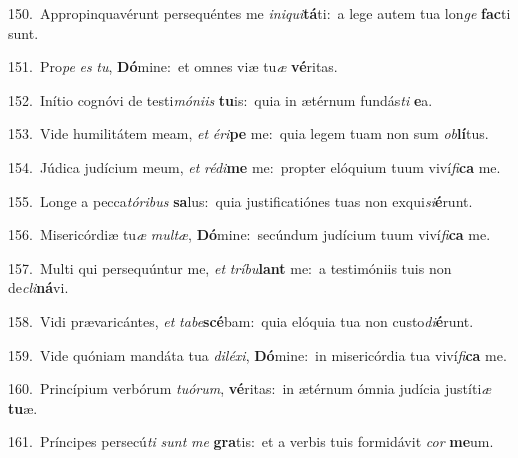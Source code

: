 {\numbfont\textcolor{\numbcolor}{150.}}~Appropinquavérunt persequéntes me \textit{in}\-\textit{i}\textit{qui}\textbf{tá}ti:~\star a lege autem tua lon\textit{ge} \textbf{fac}\-ti sunt.\par
{\numbfont\textcolor{\numbcolor}{151.}}~Pro\textit{pe} \textit{es} \textit{tu}\-, \textbf{Dó}\-mine:~\star et omnes viæ tu\textit{æ} \textbf{vé}\-ritas.\par
{\numbfont\textcolor{\numbcolor}{152.}}~Inítio cognóvi de testi\-\textit{mó}\-\textit{ni}\textit{is} \textbf{tu}\-is:~\star quia in ætérnum fundás\textit{ti} \textbf{e}\-a.\par
{\numbfont\textcolor{\numbcolor}{153.}}~Vide humilitátem meam, \textit{et} \textit{é}\-\textit{ri}\textbf{pe} me:~\star quia legem tuam non sum \textit{ob}\-\textbf{lí}tus.\par
{\numbfont\textcolor{\numbcolor}{154.}}~Júdica judícium meum, \textit{et} \textit{réd}\-\textit{i}\textbf{me} me:~\star propter elóquium tuum viví\-\textit{fi}\-\textbf{ca} me.\par
{\numbfont\textcolor{\numbcolor}{155.}}~Longe a pecca\-\textit{tó}\-\textit{ri}\textit{bus} \textbf{sa}\-lus:~\star quia justificatiónes tuas non exqui\-\textit{si}\-\textbf{é}runt.\par
{\numbfont\textcolor{\numbcolor}{156.}}~Misericórdiæ tu\textit{æ} \textit{mul}\-\textit{tæ}, \textbf{Dó}\-mine:~\star secúndum judícium tuum viví\-\textit{fi}\-\textbf{ca} me.\par
{\numbfont\textcolor{\numbcolor}{157.}}~Multi qui persequúntur me, \textit{et} \textit{trí}\-\textit{bu}\textbf{lant} me:~\star a testimóniis tuis non de\-\textit{cli}\-\textbf{ná}vi.\par
{\numbfont\textcolor{\numbcolor}{158.}}~Vidi prævaricántes, \textit{et} \textit{ta}\-\textit{be}\textbf{scé}bam:~\star quia elóquia tua non custo\-\textit{di}\-\textbf{é}runt.\par
{\numbfont\textcolor{\numbcolor}{159.}}~Vide quóniam mandáta tua \textit{di}\-\textit{lé}\textit{xi}, \textbf{Dó}\-mine:~\star in misericórdia tua viví\-\textit{fi}\-\textbf{ca} me.\par
{\numbfont\textcolor{\numbcolor}{160.}}~Princípium verbórum \textit{tu}\-\textit{ó}\textit{rum}, \textbf{vé}\-ritas:~\star in ætérnum ómnia judícia justíti\textit{æ} \textbf{tu}\-æ.\par
{\numbfont\textcolor{\numbcolor}{161.}}~Príncipes persecú\textit{ti} \textit{sunt} \textit{me} \textbf{gra}\-tis:~\star et a verbis tuis formidávit \textit{cor} \textbf{me}\-um.\par
